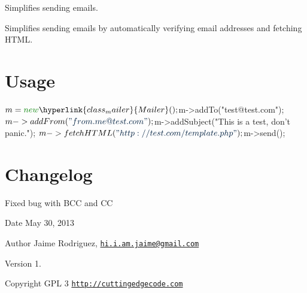 Simplifies sending emails.

Simplifies sending emails by automatically verifying email addresses and fetching H\-T\-M\-L.\hypertarget{template1_usage}{}\section{Usage}\label{template1_usage}

\begin{DoxyCode}
$m = \textcolor{keyword}{new} \hyperlink{class_mailer}{Mailer}();
$m->addTo(\textcolor{stringliteral}{"test@test.com"});
$m->addFrom(\textcolor{stringliteral}{"from.me@test.com"});
$m->addSubject(\textcolor{stringliteral}{"This is a test, don't panic."});
$m->fetchHTML(\textcolor{stringliteral}{"http://test.com/template.php"});
$m->send();
\end{DoxyCode}
\hypertarget{template1_changelog}{}\section{Changelog}\label{template1_changelog}

\begin{DoxyItemize}
\item Fixed bug with B\-C\-C and C\-C
\end{DoxyItemize}

\begin{DoxyDate}{Date}
May 30, 2013 
\end{DoxyDate}
\begin{DoxyAuthor}{Author}
Jaime Rodriguez, \href{mailto:hi.i.am.jaime@gmail.com}{\tt hi.\-i.\-am.\-jaime@gmail.\-com} 
\end{DoxyAuthor}
\begin{DoxyVersion}{Version}
1. 
\end{DoxyVersion}
\begin{DoxyCopyright}{Copyright}
G\-P\-L 3 \href{http://cuttingedgecode.com}{\tt http\-://cuttingedgecode.\-com} 
\end{DoxyCopyright}

